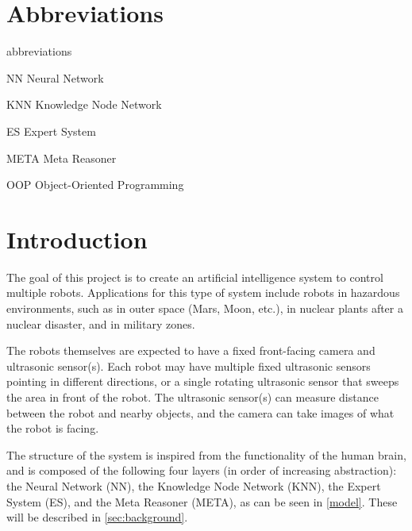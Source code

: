 \documentclass[titlepage,11pt]{article}
\begin{document}
\clearpage
\tableofcontents

\listoffigures
\listoftables
\lstlistoflistings
\clearpage

\twocolumn

\section*{Abbreviations}

\begin{labeling}{abbreviations}
\item [NN] Neural Network
\item [KNN] Knowledge Node Network
\item [ES] Expert System
\item [META] Meta Reasoner
\item [OOP] Object-Oriented Programming
\end{labeling}

\section{Introduction} \label{sec:intro}

The goal of this project is to create an artificial intelligence system to control multiple robots. Applications for this type of system include robots in hazardous environments, such as in outer space (Mars, Moon, etc.), in nuclear plants after a nuclear disaster, and in military zones.

The robots themselves are expected to have a fixed front-facing camera and ultrasonic sensor(s). Each robot may have multiple fixed ultrasonic sensors pointing in different directions, or a single rotating ultrasonic sensor that sweeps the area in front of the robot. The ultrasonic sensor(s) can measure distance between the robot and nearby objects, and the camera can take images of what the robot is facing.

The structure of the system is inspired from the functionality of the human brain, and is composed of the following four layers (in order of increasing abstraction): the Neural Network (NN), the Knowledge Node Network (KNN), the Expert System (ES), and the Meta Reasoner (META), as can be seen in \autoref{model}. These will be described in \autoref{sec:background}.
\end{document}
